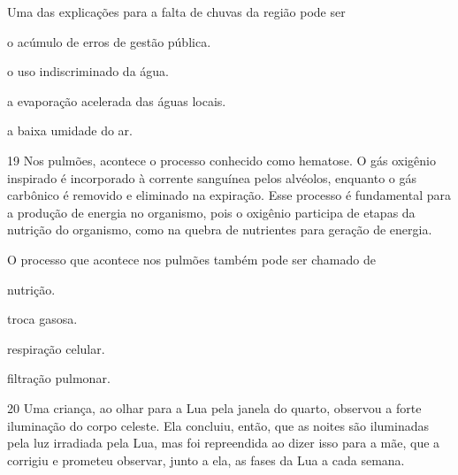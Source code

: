 Uma das explicações para a falta de chuvas da região pode ser

\begin{minipage}{.5\textwidth}
\begin{escolha}
\item o acúmulo de erros de gestão pública.

\item o uso indiscriminado da água.

\item a evaporação acelerada das águas locais.

\item a baixa umidade do ar.
\end{escolha}
\end{minipage}

\num{19} Nos pulmões, acontece o processo conhecido como hematose. O
gás oxigênio inspirado é incorporado à corrente sanguínea pelos
alvéolos, enquanto o gás carbônico é removido e eliminado na expiração.
Esse processo é fundamental para a produção de energia no organismo,
pois o oxigênio participa de etapas da nutrição do organismo, como na
quebra de nutrientes para geração de energia.

O processo que acontece nos pulmões também pode ser chamado de

\begin{minipage}{.5\textwidth}
\begin{escolha}
\item nutrição.

\item troca gasosa.

\item respiração celular.

\item filtração pulmonar.
\end{escolha}
\end{minipage}

\num{20} Uma criança, ao olhar para a Lua pela janela do quarto,
observou a forte iluminação do corpo celeste. Ela concluiu, então, que
as noites são iluminadas pela luz irradiada pela Lua, mas foi
repreendida ao dizer isso para a mãe, que a corrigiu e prometeu
observar, junto a ela, as fases da Lua a cada semana.

